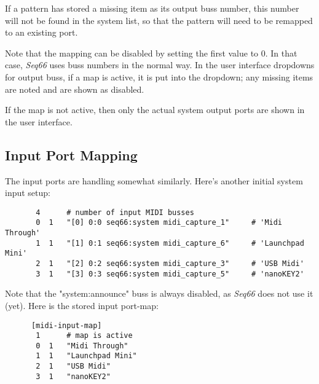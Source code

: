    If a pattern has stored a missing item as its output
   buss number, this number will not be found in the system list, so that the
   pattern will need to be remapped to an existing port.

   Note that the mapping can be disabled by setting the first value to 0.  In
   that case, \textsl{Seq66} uses buss numbers in the normal way.
   In the user interface dropdowns for output buss, if a map is active, it is
   put into the dropdown; any missing items are noted and are shown as
   disabled.


   If the map is not active, then only the actual system output ports are
   shown in the user interface.

\subsection{Input Port Mapping}
\label{subsec:input_port_mapping}

   The input ports are handling somewhat similarly.  Here's another
   initial system input setup:

   \begin{verbatim}
       4      # number of input MIDI busses
       0  1   "[0] 0:0 seq66:system midi_capture_1"     # 'Midi Through'
       1  1   "[1] 0:1 seq66:system midi_capture_6"     # 'Launchpad Mini'
       2  1   "[2] 0:2 seq66:system midi_capture_3"     # 'USB Midi'
       3  1   "[3] 0:3 seq66:system midi_capture_5"     # 'nanoKEY2'
   \end{verbatim}

   Note that the "system:announce" buss is always disabled, as \textsl{Seq66}
   does not use it (yet).  Here is the stored input port-map:

   \begin{verbatim}
      [midi-input-map]
       1      # map is active
       0  1   "Midi Through"
       1  1   "Launchpad Mini"
       2  1   "USB Midi"
       3  1   "nanoKEY2"
   \end{verbatim}

